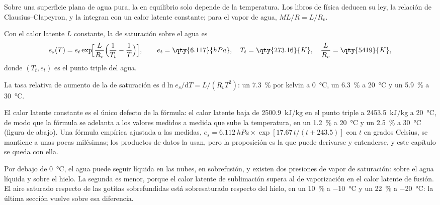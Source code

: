 Sobre una superficie plana de agua pura, la  en equilibrio solo depende de la
temperatura. Los libros de física deducen su ley, la relación de Clausius--Clapeyron, y la integran
con un calor latente constante; para el vapor de agua, $M L/R = L/R_v$.

\begin{proposition}\label{prop:b2:atmospheric-thermodynamics:es}
Con el calor latente $L$ constante, la  de saturación sobre el agua es
\[
  e_s(T) = e_t \exp\!\Bigl[\frac{L}{R_v}\Bigl(\frac{1}{T_t} - \frac{1}{T}\Bigr)\Bigr],
  \qquad e_t = \qty{6.117}{hPa}, \quad T_t = \qty{273.16}{K}, \quad \frac{L}{R_v} =
  \qty{5419}{K},
\]
donde $(T_t, e_t)$ es el punto triple del agua.
\end{proposition}

\begin{corollary}\label{cor:b2:atmospheric-thermodynamics:seven}
La tasa relativa de aumento de la  de saturación es
$\mathrm{d}\ln e_s/\mathrm{d}T = L/(R_v T^2)$: un \qty{7.3}{\percent} por kelvin a
\qty{0}{\celsius}, un \qty{6.3}{\percent} a \qty{20}{\celsius} y un \qty{5.9}{\percent} a
\qty{30}{\celsius}.
\end{corollary}

El calor latente constante es el único defecto de la fórmula: el calor latente baja de
\qty{2500.9}{kJ/kg} en el punto triple a \qty{2453.5}{kJ/kg} a \qty{20}{\celsius}, de modo que la
fórmula se adelanta a los valores medidos a medida que sube la temperatura, en un \qty{1.2}{\percent} a
\qty{20}{\celsius} y un \qty{2.5}{\percent} a \qty{30}{\celsius} (figura de abajo). Una fórmula
empírica ajustada a las medidas, $e_s = \qty{6.112}{hPa} \times \exp[17.67\,t/(t + 243.5)]$ con
$t$ en grados Celsius, se mantiene a unas pocas milésimas; los productos de datos la usan, pero la
proposición es la que puede derivarse y entenderse, y este capítulo se queda con ella.

Por debajo de \qty{0}{\celsius}, el agua puede seguir líquida en las nubes, en sobrefusión, y existen dos presiones de vapor
de saturación: sobre el agua líquida y sobre el hielo. La segunda es menor, porque el calor latente
de sublimación supera al de vaporización en el calor latente de fusión. El aire saturado
respecto de las gotitas sobrefundidas está sobresaturado respecto del hielo, en un \qty{10}{\percent} a
\qty{-10}{\celsius} y un \qty{22}{\percent} a \qty{-20}{\celsius}: la última sección vuelve sobre
esa diferencia.

